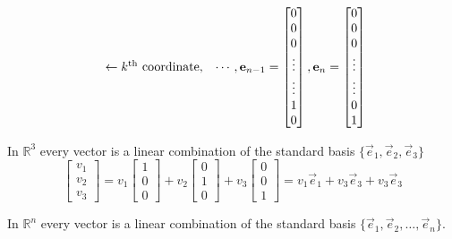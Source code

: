 \begin{remark}
\[\begin{array}{l}
\phantom{0} \\  \phantom{\vdots} \\ \phantom{0} \\ \gets k^{\tiny{\text{th}}} 
\text{ coordinate, } \\ \phantom{0} \\ \phantom{\vdots} \\ \phantom{0} 
\end{array} 
\cdots,
\vec{e}_{n-1}=\begin{bmatrix} 0 \\  0 \\ 0 \\ \vdots \\ \vdots \\ 1 \\ 0\end{bmatrix},
\vec{e}_{n}=\begin{bmatrix} 0 \\  0 \\ 0 \\ \vdots\\ \vdots \\ 0 \\ 1\end{bmatrix}
\]
\end{remark}
\begin{example}
In $\mathbb{R}^3 $ every vector is a linear combination of the standard basis 
$\{\vec{e}_1,\vec{e}_2,\vec{e}_3\}$
\[
\begin{bmatrix}v_1 \\ v_2 \\ v_3\end{bmatrix}=
v_1 \begin{bmatrix}1 \\ 0 \\ 0\end{bmatrix}+
v_2 \begin{bmatrix}0 \\ 1 \\ 0\end{bmatrix}+
v_3 \begin{bmatrix}0 \\ 0 \\ 1\end{bmatrix}
=v_1\vec{e}_1+v_3\vec{e}_3+v_3\vec{e}_3
\]
\end{example}

\begin{proposition}
In $\mathbb{R}^n$ every vector is a linear combination of the standard basis 
$\{\vec{e}_1, \vec{e}_2, \ldots, \vec{e}_n\}$.
\end{proposition}

